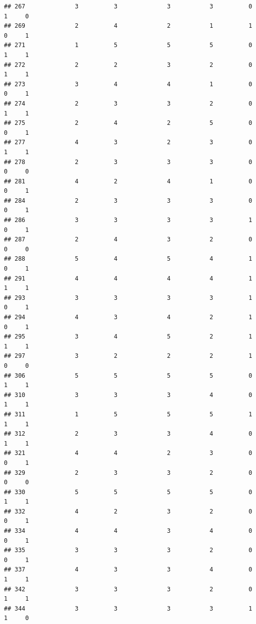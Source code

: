 \documentclass[
]{article}
\begin{document}
\begin{verbatim}
## 267              3          3              3           3          0    1     0
## 269              2          4              2           1          1    0     1
## 271              1          5              5           5          0    1     1
## 272              2          2              3           2          0    1     1
## 273              3          4              4           1          0    0     1
## 274              2          3              3           2          0    1     1
## 275              2          4              2           5          0    0     1
## 277              4          3              2           3          0    1     1
## 278              2          3              3           3          0    0     0
## 281              4          2              4           1          0    0     1
## 284              2          3              3           3          0    0     1
## 286              3          3              3           3          1    0     1
## 287              2          4              3           2          0    0     0
## 288              5          4              5           4          1    0     1
## 291              4          4              4           4          1    1     1
## 293              3          3              3           3          1    0     1
## 294              4          3              4           2          1    0     1
## 295              3          4              5           2          1    1     1
## 297              3          2              2           2          1    0     0
## 306              5          5              5           5          0    1     1
## 310              3          3              3           4          0    1     1
## 311              1          5              5           5          1    1     1
## 312              2          3              3           4          0    1     1
## 321              4          4              2           3          0    0     1
## 329              2          3              3           2          0    0     0
## 330              5          5              5           5          0    1     1
## 332              4          2              3           2          0    0     1
## 334              4          4              3           4          0    0     1
## 335              3          3              3           2          0    0     1
## 337              4          3              3           4          0    1     1
## 342              3          3              3           2          0    1     1
## 344              3          3              3           3          1    1     0

\end{verbatim}
\end{document}

